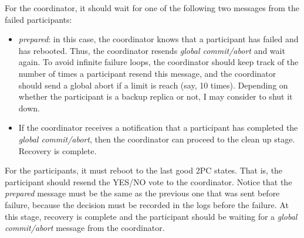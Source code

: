 For the coordinator, it should wait for one of the following two messages from the failed participants:
\begin{itemize}
\item
\emph{prepared}:
in this case, the coordinator knows that a participant has failed and has rebooted.
Thus, the coordinator resends \emph{global commit/abort} and wait again.
To avoid infinite failure loops, the coordinator should keep track of the number of times a participant resend this message, and the coordinator should send a global abort if a limit is reach (say, 10 times).
Depending on whether the participant is a backup replica or not, I may consider to shut it down.
\item
If the coordinator receives a notification that a participant has completed the \emph{global commit/abort}, then the coordinator can proceed to the clean up stage.
Recovery is complete.
\end{itemize}

For the participants, it must reboot to the last good 2PC states.
That is, the participant should resend the YES/NO vote to the coordinator.
Notice that the \emph{prepared} message must be the same as the previous one that was sent before failure, because the decision must be recorded in the logs before the failure.
At this stage, recovery is complete and the participant should be waiting for a \emph{global commit/abort} message from the coordinator.
